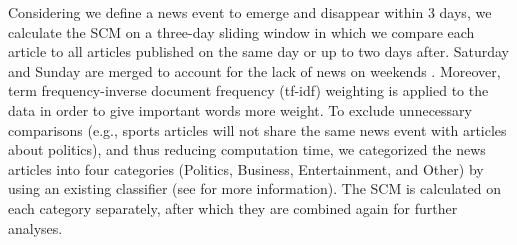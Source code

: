 {Considering we define a news event to emerge and disappear within 3 days, we calculate the SCM on a three-day sliding window in which we compare each article to all articles published on the same day or up to two days after. Saturday and Sunday are merged to account for the lack of news on weekends . Moreover, term frequency-inverse document frequency (tf-idf) weighting is applied to the data in order to give important words more weight. To exclude unnecessary comparisons (e.g., sports articles will not share the same news event with articles about politics), and thus reducing computation time, we categorized the news articles into four categories (Politics, Business, Entertainment, and Other) by using an existing classifier (see \cite{vermeer2018} for more information). The SCM is calculated on each category separately, after which they are combined again for further analyses.


}
